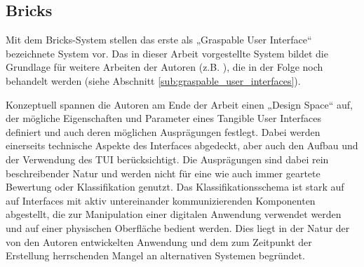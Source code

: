 \subsection{Bricks} %
\label{sub:bricks}

Mit dem Bricks-System stellen \citet{Fitzmaurice95} das erste als „Graspable User Interface“ bezeichnete System vor. Das in dieser Arbeit vorgestellte System bildet die Grundlage für weitere Arbeiten der Autoren (z.B. \citep{Fitzmaurice96}), die in der Folge noch behandelt werden (siehe Abschnitt \ref{sub:graspable_user_interfaces}). 

Konzeptuell spannen die Autoren am Ende der Arbeit einen „Design Space“ auf, der mögliche Eigenschaften und Parameter eines Tangible User Interfaces definiert und auch deren möglichen Ausprägungen festlegt. Dabei werden einerseits technische Aspekte des Interfaces abgedeckt, aber auch den Aufbau und der Verwendung des \gls{TUI} berücksichtigt. Die Ausprägungen sind dabei rein beschreibender Natur und werden nicht für eine wie auch immer geartete Bewertung oder Klassifikation genutzt. Das Klassifikationsschema ist stark auf auf Interfaces mit aktiv untereinander kommunizierenden Komponenten abgestellt, die zur Manipulation einer digitalen Anwendung verwendet werden und auf einer physischen Oberfläche bedient werden. Dies liegt in der Natur der von den Autoren entwickelten Anwendung und dem zum Zeitpunkt der Erstellung herrschenden Mangel an alternativen Systemen begründet.

